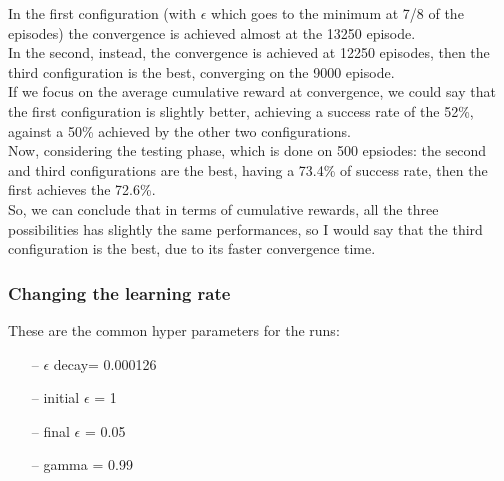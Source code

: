 \documentclass{article}
\begin{document}
\begin{center}
\centering
{}
\end{center}

\clearpage


In the first configuration (with $\epsilon$ which goes to the minimum at 7/8 of the episodes) the convergence is achieved almost at the 13250 episode.
\\
In the second, instead, the convergence is achieved at 12250 episodes, then the third configuration is the best, converging on the 9000 episode.
\\
If we focus on the average cumulative reward at convergence, we could say that the first configuration is slightly better, achieving a success rate of the 52\%, against a 50\% achieved by the other two configurations.
\\
Now, considering the testing phase, which is done on 500 epsiodes: the second and third configurations are the best, having a 73.4\% of success rate, then the first achieves the 72.6\%.
\\
So, we can conclude that in terms of cumulative rewards, all the three possibilities has slightly the same performances, so I would say that the third configuration is the best, due to its faster convergence time.


\subsubsection{Changing the learning rate}


These are the common hyper parameters for the runs:
\begin{itemize}
\item[--] $\epsilon$ decay= 0.000126
\item[--] initial $\epsilon$ = 1
\item[--] final $\epsilon$ = 0.05
\item[--] gamma = 0.99
\end{itemize}
\end{document}
